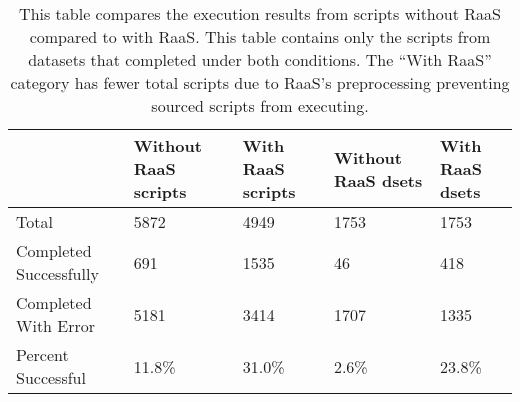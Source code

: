 \begin{table}
\centering
\caption{This table compares the execution results from scripts without RaaS compared to with RaaS. This table contains only the scripts from datasets that completed under both conditions. The ``With RaaS'' category has fewer total scripts due to RaaS's preprocessing preventing sourced scripts from executing.}
\label{tab:pre-post}
\begin{tabular}{lllll}
\toprule
{} & Without RaaS scripts & With RaaS scripts & Without RaaS dsets & With RaaS dsets \\
\midrule
Total                  &                 5872 &              4949 &               1753 &            1753 \\ \hline
Completed Successfully &                  691 &              1535 &                 46 &             418 \\ \hline
Completed With Error   &                 5181 &              3414 &               1707 &            1335 \\ \hline
Percent Successful     &                11.8\% &             31.0\% &               2.6\% &           23.8\% \\
\bottomrule
\end{tabular}
\end{table}
